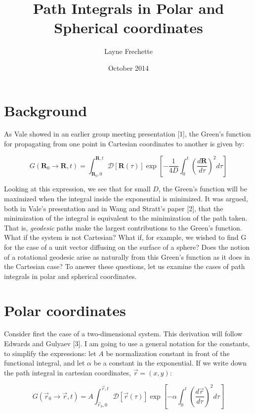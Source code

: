 \documentclass[12pt,a4paper]{article}
\begin{document}
\title{Path Integrals in Polar and Spherical coordinates}
\author{Layne Frechette}
\date{October 2014}
\maketitle

\section{Background}

As Vale showed in an earlier group meeting presentation [1], the Green's function for propagating from one point in Cartesian coordinates to another is given by:

\[
G(\textbf{R}_0 \rightarrow \textbf{R}, t) = \int_{\textbf{R}_0, 0}^{\textbf{R}, t}\mathcal{D}[\textbf{R}(\tau)]\exp\left[-\frac{1}{4D}\int_0^t \left(\frac{d\textbf{R}}{d\tau}\right)^2d\tau\right]
\]

Looking at this expression, we see that for small $D$, the Green's function will be maximized when the integral inside the exponential is minimized. It was argued, both in Vale's presentation and in Wang and Stratt's paper [2], that the minimization of the integral is equivalent to the minimization of the path taken. That is, \textit{geodesic} paths make the largest contributions to the Green's function.\\

What if the system is not Cartesian? What if, for example, we wished to find G for the case of a unit vector diffusing on the surface of a sphere? Does the notion of a rotational geodesic arise as naturally from this Green's function as it does in the Cartesian case? To answer these questions, let us examine the cases of path integrals in polar and spherical coordinates.

\section{Polar coordinates}
Consider first the case of a two-dimensional system. This derivation will follow Edwards and Gulyaev [3]. I am going to use a general notation for the constants, to simplify the expressions: let $A$ be normalization constant in front of the functional integral, and let $\alpha$ be a constant in the exponential. If we write down the path integral in cartesian coordinates, $\vec{r}=(x,y)$:

\[
G(\vec{r}_0 \rightarrow \vec{r}, t) = A\int_{\vec{r}_0, 0}^{\vec{r}, t}\mathcal{D}[\vec{r}(\tau)]\exp\left[-\alpha\int_0^t \left(\frac{d\vec{r}}{d\tau}\right)^2d\tau\right]
\]
\end{document}
